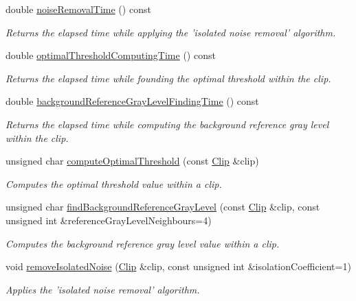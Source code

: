 \begin{CompactItemize}
double \hyperlink{class_preprocessor_0cccd23820430541f18f2b24dbfd0784}{noiseRemovalTime} () const 
\begin{CompactList}\small\item\em Returns the elapsed time while applying the 'isolated noise removal' algorithm. \item\end{CompactList}\item 
double \hyperlink{class_preprocessor_72dd29238c4202698e67dcb26a47f4b5}{optimalThresholdComputingTime} () const 
\begin{CompactList}\small\item\em Returns the elapsed time while founding the optimal threshold within the clip. \item\end{CompactList}\item 
double \hyperlink{class_preprocessor_3189cad5515476d54cc14effcf983fc7}{backgroundReferenceGrayLevelFindingTime} () const 
\begin{CompactList}\small\item\em Returns the elapsed time while computing the background reference gray level within the clip. \item\end{CompactList}\item 
unsigned char \hyperlink{class_preprocessor_0e146cafa6b8b31f4f4ed189a970db7a}{computeOptimalThreshold} (const \hyperlink{class_clip}{Clip} \&clip)
\begin{CompactList}\small\item\em Computes the optimal threshold value within a clip. \item\end{CompactList}\item 
unsigned char \hyperlink{class_preprocessor_19aa90451cf6f99854833c05d3e71270}{findBackgroundReferenceGrayLevel} (const \hyperlink{class_clip}{Clip} \&clip, const unsigned int \&referenceGrayLevelNeighbours=4)
\begin{CompactList}\small\item\em Computes the background reference gray level value within a clip. \item\end{CompactList}\item 
void \hyperlink{class_preprocessor_a365f69af48cae608071e9943f300dd5}{removeIsolatedNoise} (\hyperlink{class_clip}{Clip} \&clip, const unsigned int \&isolationCoefficient=1)
\begin{CompactList}\small\item\em Applies the 'isolated noise removal' algorithm. \item\end{CompactList}\end{CompactItemize}

